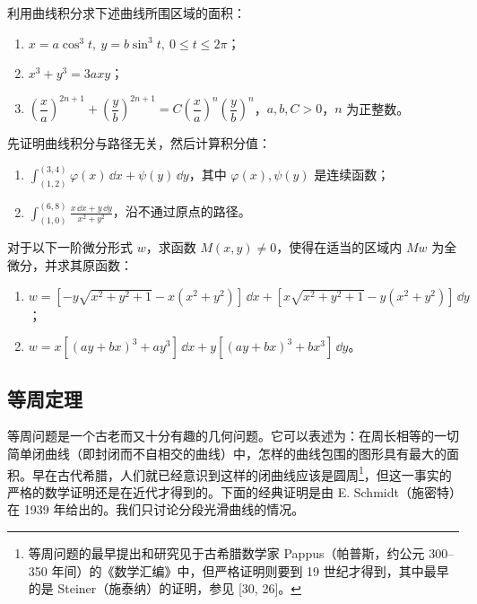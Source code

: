 \begin{xexercise}[7]
利用曲线积分求下述曲线所围区域的面积：
\begin{enumerate}[label=(\arabic*)]
  \item $x=a\cos^3t,\ y=b\sin^3t,\ 0\le t\le2\pi$；
  \item $x^3+y^3=3axy$；
  \item $\left(\dfrac xa\right)^{2n+1}+\left(\dfrac yb\right)^{2n+1}=C\left(\dfrac xa\right)^n\left(\dfrac yb\right)^n$，$a,b,C>0$，$n$ 为正整数。
\end{enumerate}
\end{xexercise}\begin{xexercise}[8]
先证明曲线积分与路径无关，然后计算积分值：
\begin{enumerate}[label=(\arabic*)]
  \item $\displaystyle\int_{(1,2)}^{(3,4)}\varphi(x)\,\dd x+\psi(y)\,\dd y$，其中 $\varphi(x),\psi(y)$ 是连续函数；
  \item $\displaystyle\int_{(1,0)}^{(6,8)}\frac{x\,\dd x+y\,\dd y}{x^2+y^2}$，沿不通过原点的路径。
\end{enumerate}
\end{xexercise}\begin{xexercise}[9]
对于以下一阶微分形式 $w$，求函数 $M(x,y)\ne0$，使得在适当的区域内 $Mw$ 为全微分，并求其原函数：
\begin{enumerate}[label=(\arabic*)]
  \item $w=[-y\sqrt{x^2+y^2+1}-x(x^2+y^2)]\,\dd x+[x\sqrt{x^2+y^2+1}-y(x^2+y^2)]\,\dd y$；
  \item $w=x[(ay+bx)^3+ay^3]\,\dd x+y[(ay+bx)^3+bx^3]\,\dd y$。
\end{enumerate}
\end{xexercise}

\subsection{等周定理}

等周问题是一个古老而又十分有趣的几何问题。它可以表述为：在周长相等的一切简单闭曲线（即封闭而不自相交的曲线）中，怎样的曲线包围的图形具有最大的面积。早在古代希腊，人们就已经意识到这样的闭曲线应该是圆周\footnote{等周问题的最早提出和研究见于古希腊数学家 Pappus（帕普斯，约公元 300--350 年间）的《数学汇编》中，但严格证明则要到 19 世纪才得到，其中最早的是 Steiner（施泰纳）的证明，参见 [30, 26]。}，但这一事实的严格的数学证明还是在近代才得到的。下面的经典证明是由 E. Schmidt（施密特）在 1939 年给出的。我们只讨论分段光滑曲线的情况。

